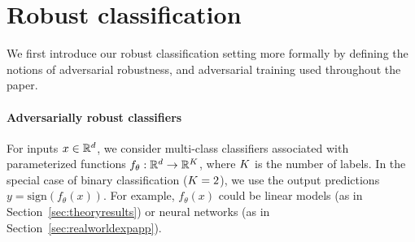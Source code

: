 \section{Robust classification}
\label{sec:robustness}



We first introduce our robust classification setting more formally by defining
the notions of  adversarial robustness, \nameofattacks and adversarial training
used throughout the paper.


\paragraph{Adversarially robust classifiers}

For inputs $x \in \mathbb{R}^d$, we consider multi-class classifiers
associated with parameterized functions $f_\theta:\mathbb{R}^d \to
\mathbb{R}^K$, where $K$ is the number of labels. In the special case of binary classification ($K = 2$), we use the output predictions $y=\textrm{sign}(f_\theta(x))$. For example, $f_\theta(x)$ could be linear models (as in Section~\ref{sec:theoryresults}) or
neural networks (as in Section~\ref{sec:realworldexpapp}).

